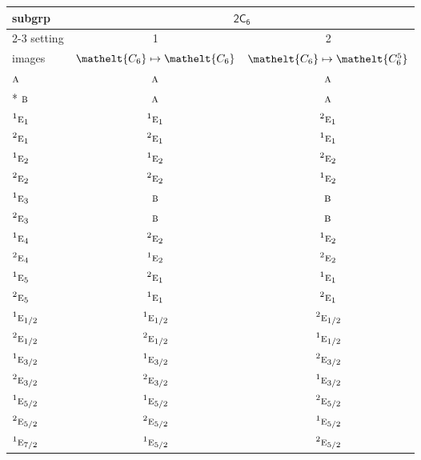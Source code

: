 \documentclass[10pt,a4paper]{article}
\numberwithin{equation}{section}
\newcommand{\eltfont}[1]{{\let\sigma\eltsigma\mathelt{#1}}}
\newcommand{\grp}[1]{\mathsf{#1}}
\newcommand{\irr}[1]{\text{\normalfont\scshape #1}}
\newcommand{\conjpair}[1]{{}^{#1}}
\newcommand{\cls}[1]{\eltfont{#1}}
\begin{document}
{\small\begin{longtable}{@{}lcc@{}}\toprule
subgrp & \multicolumn{2}{c}{\href{2C6.pdf}{$\grp{2C_{6}}$}}\\\cmidrule(lr){2-3}
setting & 1 & 2\\
images & {\scriptsize $\cls{C_{6}} \mapsto \cls{C_{6}}$} & {\scriptsize $\cls{C_{6}} \mapsto \cls{C_{6}^{5}}$}\\\midrule\endhead
\bottomrule\endfoot\endlastfoot
$\irr{a}$ & $\irr{a}$ & $\irr{a}$\\*
$\irr{b}$ & $\irr{a}$ & $\irr{a}$\\
$\conjpair{1}\irr{e}_{1}$ & $\conjpair{1}\irr{e}_{1}$ & $\conjpair{2}\irr{e}_{1}$\\
$\conjpair{2}\irr{e}_{1}$ & $\conjpair{2}\irr{e}_{1}$ & $\conjpair{1}\irr{e}_{1}$\\
$\conjpair{1}\irr{e}_{2}$ & $\conjpair{1}\irr{e}_{2}$ & $\conjpair{2}\irr{e}_{2}$\\
$\conjpair{2}\irr{e}_{2}$ & $\conjpair{2}\irr{e}_{2}$ & $\conjpair{1}\irr{e}_{2}$\\
$\conjpair{1}\irr{e}_{3}$ & $\irr{b}$ & $\irr{b}$\\
$\conjpair{2}\irr{e}_{3}$ & $\irr{b}$ & $\irr{b}$\\
$\conjpair{1}\irr{e}_{4}$ & $\conjpair{2}\irr{e}_{2}$ & $\conjpair{1}\irr{e}_{2}$\\
$\conjpair{2}\irr{e}_{4}$ & $\conjpair{1}\irr{e}_{2}$ & $\conjpair{2}\irr{e}_{2}$\\
$\conjpair{1}\irr{e}_{5}$ & $\conjpair{2}\irr{e}_{1}$ & $\conjpair{1}\irr{e}_{1}$\\
$\conjpair{2}\irr{e}_{5}$ & $\conjpair{1}\irr{e}_{1}$ & $\conjpair{2}\irr{e}_{1}$\\
$\conjpair{1}\irr{e}_{1/2}$ & $\conjpair{1}\irr{e}_{1/2}$ & $\conjpair{2}\irr{e}_{1/2}$\\
$\conjpair{2}\irr{e}_{1/2}$ & $\conjpair{2}\irr{e}_{1/2}$ & $\conjpair{1}\irr{e}_{1/2}$\\
$\conjpair{1}\irr{e}_{3/2}$ & $\conjpair{1}\irr{e}_{3/2}$ & $\conjpair{2}\irr{e}_{3/2}$\\
$\conjpair{2}\irr{e}_{3/2}$ & $\conjpair{2}\irr{e}_{3/2}$ & $\conjpair{1}\irr{e}_{3/2}$\\
$\conjpair{1}\irr{e}_{5/2}$ & $\conjpair{1}\irr{e}_{5/2}$ & $\conjpair{2}\irr{e}_{5/2}$\\
$\conjpair{2}\irr{e}_{5/2}$ & $\conjpair{2}\irr{e}_{5/2}$ & $\conjpair{1}\irr{e}_{5/2}$\\
$\conjpair{1}\irr{e}_{7/2}$ & $\conjpair{1}\irr{e}_{5/2}$ & $\conjpair{2}\irr{e}_{5/2}$\\

\end{longtable}}
\end{document}

